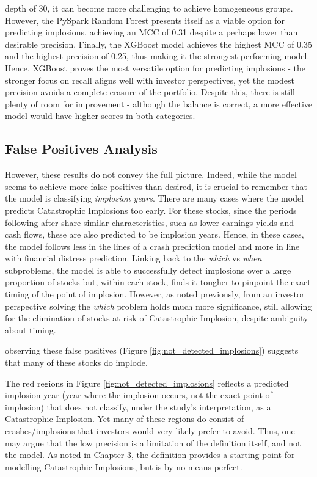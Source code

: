 \documentclass[a4paper]{report}
\begin{document}
depth of 30, it can become more challenging to achieve homogeneous groups. However, the PySpark Random Forest presents itself as a viable option for predicting implosions, achieving an MCC of 0.31 despite 
a perhaps lower than desirable precision. Finally, the XGBoost model achieves the highest MCC of 0.35 and the highest precision of 0.25, thus making it the strongest-performing 
model. Hence, XGBoost proves the most versatile option for predicting implosions - the stronger focus on recall aligns well with investor perspectives, yet the modest 
precision avoids a complete erasure of the portfolio. Despite this, there is still plenty of room for improvement - although the balance is correct, a more effective model would have higher scores in both categories.

\subsection{False Positives Analysis}
However, these results do not convey the full picture. Indeed, while the model seems to achieve more false positives than desired, it is crucial to remember that the model is classifying \textit{implosion years}. There are many cases 
where the model predicts Catastrophic Implosions too early. For these stocks, since the periods following after share similar characteristics, such as lower earnings yields and cash flows, these are also predicted to be implosion years. Hence,
in these cases, the model follows less in the lines of a crash prediction model and more in line with financial distress prediction. Linking back to the \textit{which} vs \textit{when} subproblems, the model is able to successfully 
detect implosions over a large proportion of stocks but, within each stock, finds it tougher to pinpoint the exact timing of the point of implosion. However, as noted previously, from an investor perspective solving the \textit{which} 
problem holds much more significance, still allowing for the elimination of stocks at risk of Catastrophic Implosion, despite ambiguity about timing. 

observing these false positives (Figure \ref{fig:not_detected_implosions}) suggests that 
many of these stocks do implode. 


The red regions in Figure \ref{fig:not_detected_implosions} reflects a predicted implosion year (year where the implosion occurs, not the exact point of implosion) that does not classify, under the study's interpretation, as a Catastrophic Implosion. Yet
many of these regions do consist of crashes/implosions that investors would very likely prefer to avoid. Thus, one may argue that the low precision is a limitation of the definition itself, and not the model. As noted in Chapter 3, the definition provides a starting point for 
modelling Catastrophic Implosions, but is by no means perfect.
\end{document}
